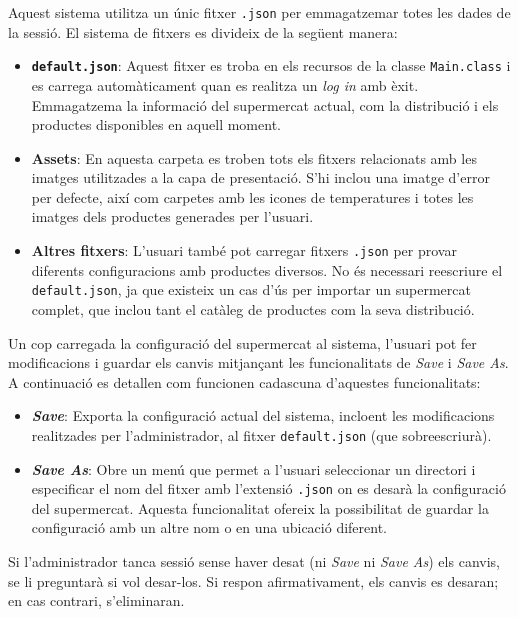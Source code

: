 \documentclass[a4paper,12pt]{article}
\begin{document}
	Aquest sistema utilitza un únic fitxer \texttt{.json} per emmagatzemar totes les dades de la sessió. El sistema de fitxers es divideix de la següent manera:
	
	\begin{itemize}
		\item \textbf{\texttt{default.json}}: Aquest fitxer es troba en els recursos de la classe \texttt{Main.class} i es carrega automàticament quan es realitza un \textit{log in} amb èxit. Emmagatzema la informació del supermercat actual, com la distribució i els productes disponibles en aquell moment.
		\item \textbf{Assets}: En aquesta carpeta es troben tots els fitxers relacionats amb les imatges utilitzades a la capa de presentació. S'hi inclou una imatge d'error per defecte, així com carpetes amb les icones de temperatures i totes les imatges dels productes generades per l'usuari.
		\item \textbf{Altres fitxers}: L'usuari també pot carregar fitxers \texttt{.json} per provar diferents configuracions amb productes diversos. No és necessari reescriure el \texttt{default.json}, ja que existeix un cas d'ús per importar un supermercat complet, que inclou tant el catàleg de productes com la seva distribució.
	\end{itemize}
	
	Un cop carregada la configuració del supermercat al sistema, l'usuari pot fer modificacions i guardar els canvis mitjançant les funcionalitats de \textit{Save} i \textit{Save As}. A continuació es detallen com funcionen cadascuna d'aquestes funcionalitats:
	
	\begin{itemize}
		\item \textbf{\textit{Save}}: Exporta la configuració actual del sistema, incloent les modificacions realitzades per l'administrador, al fitxer \texttt{default.json} (que sobreescriurà).
		\item \textbf{\textit{Save As}}: Obre un menú que permet a l'usuari seleccionar un directori i especificar el nom del fitxer amb l'extensió \texttt{.json} on es desarà la configuració del supermercat. Aquesta funcionalitat ofereix la possibilitat de guardar la configuració amb un altre nom o en una ubicació diferent.
	\end{itemize}
	
	Si l'administrador tanca sessió sense haver desat (ni \textit{Save} ni \textit{Save As}) els canvis, se li preguntarà si vol desar-los. Si respon afirmativament, els canvis es desaran; en cas contrari, s'eliminaran.	
\end{document}
